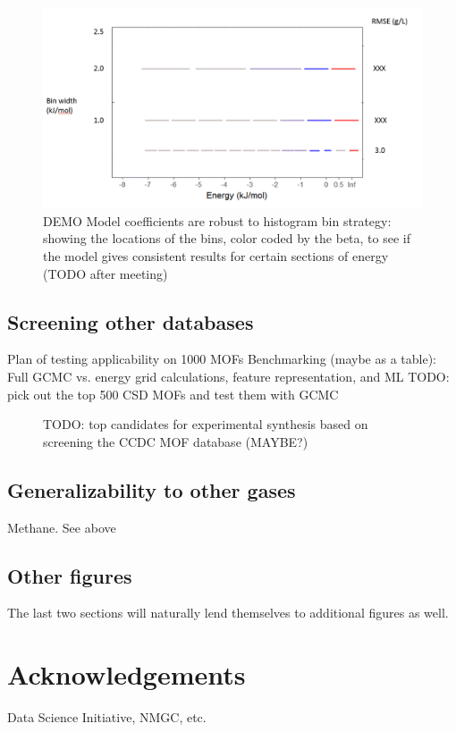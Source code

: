 \documentclass[letterpaper]{article}
\begin{document}
\begin{figure}[H]
	\centering
	\includegraphics[width=0.75\columnwidth]{Figs/beta_robustness.png}
	\caption{DEMO Model coefficients are robust to histogram bin strategy: showing the locations of the bins, color coded by the beta, to see if the model gives consistent results for certain sections of energy (TODO after meeting)}
	\label{fig:binwidth}
\end{figure}

\subsection{Screening other databases}
\begin{outline}
	\1 Plan of testing applicability on 1000 MOFs
	\1 Benchmarking (maybe as a table): Full GCMC vs. energy grid calculations, feature representation, and ML
	\1 TODO: pick out the top 500 CSD MOFs and test them with GCMC
\end{outline}
\begin{figure}[H]
	\centering
	\caption{TODO: top candidates for experimental synthesis based on screening the CCDC MOF database (MAYBE?)}
	\label{fig:candidates}
\end{figure}

\subsection{Generalizability to other gases}
\begin{outline}
	\1 Methane. See above
\end{outline}

\subsection{Other figures}
The last two sections will naturally lend themselves to additional figures as well.

\section{Acknowledgements}
Data Science Initiative, NMGC, etc.
\end{document}
